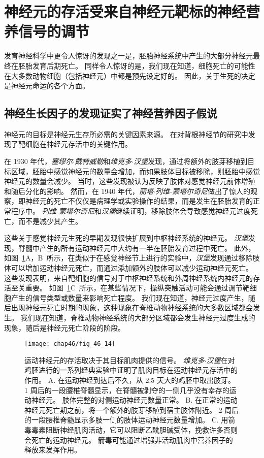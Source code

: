 \section{神经元的存活受来自神经元靶标的神经营养信号的调节}

发育神经科学中更令人惊讶的发现之一是，胚胎神经系统中产生的大部分神经元最终在胚胎发育后期死亡。
同样令人惊讶的是，我们现在知道，细胞死亡的可能性在大多数动物细胞（包括神经元）中都是预先设定好的。
因此，关于生死的决定是神经元命运的各个方面。



\subsection{神经生长因子的发现证实了神经营养因子假说}

神经元的目标是神经元生存所必需的关键因素来源。
在对背根神经节的研究中发现了靶细胞在神经元存活中的关键作用。


在 1930 年代，\textit{塞缪尔$\cdot$戴特威勒}和\textit{维克多$\cdot$汉堡}发现，通过将额外的肢芽移植到目标区域，胚胎中感觉神经元的数量会增加，而如果肢体目标被移除，则胚胎中感觉神经元的数量会减少。 
当时，这些发现被认为反映了肢体对感觉神经元前体增殖和随后分化的影响。
然而，在 1940 年代，\textit{丽塔$\cdot$列维-蒙塔尔奇尼}做出了惊人的观察，即神经元的死亡不仅仅是病理学或实验操作的结果，而是发生在胚胎发育的正常程序中。
\textit{列维-蒙塔尔奇尼}和\textit{汉堡}继续证明，移除肢体会导致感觉神经元过度死亡，而不是减少其产生。


这些关于感觉神经元生死的早期发现很快扩展到中枢神经系统的神经元。
\textit{汉堡}发现，脊髓中产生的所有运动神经元中大约有一半在胚胎发育过程中死亡。 
此外，如图~\ref{fig:46_14}A，B~所示，在类似于在感觉神经节上进行的实验中，\textit{汉堡}发现通过移除肢体可以增加运动神经元死亡，而通过添加额外的肢体可以减少运动神经元死亡。
这些发现表明，来自靶细胞的信号对于中枢神经系统和外周神经系统内神经元的存活至关重要。
如图~\ref{fig:46_14}C~所示，在某些情况下，操纵突触活动可能会通过调节靶细胞产生的信号类型或数量来影响死亡程度。
我们现在知道，神经元过度产生，随后出现神经元死亡时期的现象，这种现象在脊椎动物神经系统的大多数区域都会发生。
我们现在知道，脊椎动物神经系统的大部分区域都会发生神经元过度生成的现象，随后是神经元死亡阶段的阶段。


\begin{figure}[htbp]
	\centering
	\texttt{[image: chap46/fig\_46\_14]}
	\caption{运动神经元的存活取决于其目标肌肉提供的信号。
		\textit{维克多$\cdot$汉堡}在对鸡胚进行的一系列经典实验中证明了肌肉目标在运动神经元存活中的作用\cite{purves1985principles}。
		A. 在运动神经到达后不久，从 2.5 天大的鸡胚中取出肢芽。
		1 周后的一段腰椎脊髓显示，在脊髓被剥夺的一侧几乎没有幸存的运动神经元。
		肢体完整的对侧运动神经元数量正常。
		B. 在正常的运动神经元死亡期之前，将一个额外的肢芽移植到宿主肢体附近。
		2 周后的一段腰椎脊髓显示多肢一侧的肢体运动神经元数量增加。
		C. 用箭毒毒素阻断神经肌肉活动，它可以阻断乙酰胆碱受体，挽救许多否则会死亡的运动神经元。
		箭毒可能通过增强非活动肌肉中营养因子的释放来发挥作用。}
	\label{fig:46_14}
\end{figure}


